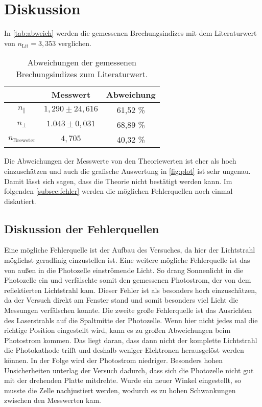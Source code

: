 \section{Diskussion}
\label{sec:Diskussion}

In \autoref{tab:abweich} werden die gemessenen Brechungsindizes mit dem Literaturwert von $n_{\text{Lit}}=3,353$ verglichen.
\begin{table}[H]
    \centering
    \caption{Abweichungen der gemessenen Brechungsindizes zum Literaturwert.}
    \label{tab:abweich}
    \begin{tabular}{c c c}
        \toprule
         & Messwert & Abweichung \\
        \midrule
        $n_{\parallel}$ & $1,290 \pm 24,616$ & 61,52 \% \\
        $n_\perp$ & $1.043 \pm 0,031$ & 68,89 \% \\
        $n_{\text{Brewster}}$ & $4,705$ & 40,32 \% \\
        \bottomrule
    \end{tabular}
\end{table}

\noindent
Die Abweichungen der Messwerte von den Theoriewerten ist eher als hoch einzuschätzen und auch die grafische Auswertung in \autoref{fig:plot} ist sehr
ungenau. Damit lässt sich sagen, dass die Theorie nicht bestätigt werden kann. Im folgenden \autoref{subsec:fehler} werden die möglichen Fehlerquellen noch einmal diskutiert.

\subsection{Diskussion der Fehlerquellen}
\label{subsec:fehler}

Eine mögliche Fehlerquelle ist der Aufbau des Versuches, da hier der Lichtstrahl möglichst geradlinig einzustellen ist.\newline
Eine weitere mögliche Fehlerquelle ist das von außen in die Photozelle einströmende Licht. So drang Sonnenlicht in die Photozelle ein und verfälschte somit den gemessenen
Photostrom, der von dem reflektierten Lichtstrahl kam. Dieser Fehler ist als besonders hoch einzuschätzen, da der Versuch direkt am Fenster stand und somit besonders viel
Licht die Messungen verfälschen konnte. \newline
Die zweite große Fehlerquelle ist das Ausrichten des Laserstrahls auf die Spaltmitte der Photozelle. Wenn hier nicht jedes mal die richtige Position eingestellt wird, kann es zu großen
Abweichungen beim Photostrom kommen. Das liegt daran, dass dann nicht der komplette Lichtstrahl die Photokathode trifft und deshalb weniger Elektronen herausgelöst werden können.
In der Folge wird der Photostrom niedriger. Besonders hohen Unsicherheiten unterlag der Versuch dadurch, dass sich die Photozelle nicht gut mit der drehenden Platte mitdrehte.
Wurde ein neuer Winkel eingestellt, so musste die Zelle nachjustiert werden, wodurch es zu hohen Schwankungen zwischen den Messwerten kam.